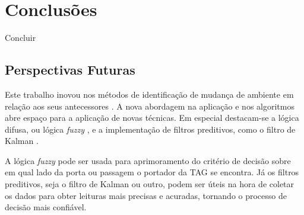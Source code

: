 
\chapter{Conclusões}

\label{CapConclusoes}

Concluir


\section{Perspectivas Futuras}

Este trabalho inovou nos métodos de identificação de mudança de ambiente em relação aos seus antecessores \cite{TG2013OliveiraERocha} \cite{TG2015RaissaERenata}. A nova abordagem na aplicação e nos algoritmos abre espaço para a aplicação de novas técnicas. Em especial destacam-se a lógica difusa, ou lógica \textit{fuzzy} \cite{yen1999fuzzy}, e a implementação de filtros preditivos, como o filtro de Kalman \cite{welch1995introduction}.

A lógica \textit{fuzzy} pode ser usada para aprimoramento do critério de decisão sobre em qual lado da porta ou passagem o portador da TAG se encontra. Já os filtros preditivos, seja o filtro de Kalman ou outro, podem ser úteis na hora de coletar os dados para obter leituras mais precisas e acuradas, tornando o processo de decisão mais confiável.
